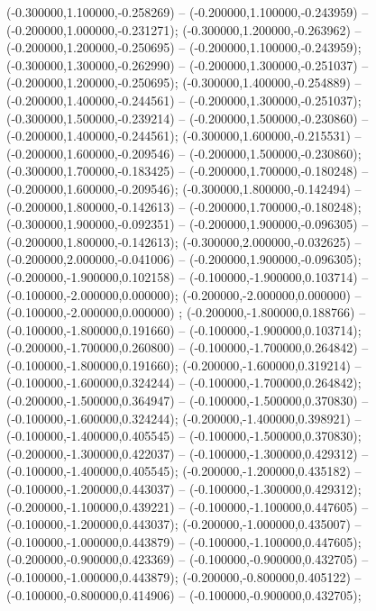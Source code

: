  (-0.300000,1.100000,-0.258269) -- (-0.200000,1.100000,-0.243959) -- (-0.200000,1.000000,-0.231271);
 (-0.300000,1.200000,-0.263962) -- (-0.200000,1.200000,-0.250695) -- (-0.200000,1.100000,-0.243959);
 (-0.300000,1.300000,-0.262990) -- (-0.200000,1.300000,-0.251037) -- (-0.200000,1.200000,-0.250695);
 (-0.300000,1.400000,-0.254889) -- (-0.200000,1.400000,-0.244561) -- (-0.200000,1.300000,-0.251037);
 (-0.300000,1.500000,-0.239214) -- (-0.200000,1.500000,-0.230860) -- (-0.200000,1.400000,-0.244561);
 (-0.300000,1.600000,-0.215531) -- (-0.200000,1.600000,-0.209546) -- (-0.200000,1.500000,-0.230860);
 (-0.300000,1.700000,-0.183425) -- (-0.200000,1.700000,-0.180248) -- (-0.200000,1.600000,-0.209546);
 (-0.300000,1.800000,-0.142494) -- (-0.200000,1.800000,-0.142613) -- (-0.200000,1.700000,-0.180248);
 (-0.300000,1.900000,-0.092351) -- (-0.200000,1.900000,-0.096305) -- (-0.200000,1.800000,-0.142613);
 (-0.300000,2.000000,-0.032625) -- (-0.200000,2.000000,-0.041006) -- (-0.200000,1.900000,-0.096305);
 (-0.200000,-1.900000,0.102158) -- (-0.100000,-1.900000,0.103714) -- (-0.100000,-2.000000,0.000000);
 (-0.200000,-2.000000,0.000000) -- (-0.100000,-2.000000,0.000000) ;
 (-0.200000,-1.800000,0.188766) -- (-0.100000,-1.800000,0.191660) -- (-0.100000,-1.900000,0.103714);
 (-0.200000,-1.700000,0.260800) -- (-0.100000,-1.700000,0.264842) -- (-0.100000,-1.800000,0.191660);
 (-0.200000,-1.600000,0.319214) -- (-0.100000,-1.600000,0.324244) -- (-0.100000,-1.700000,0.264842);
 (-0.200000,-1.500000,0.364947) -- (-0.100000,-1.500000,0.370830) -- (-0.100000,-1.600000,0.324244);
 (-0.200000,-1.400000,0.398921) -- (-0.100000,-1.400000,0.405545) -- (-0.100000,-1.500000,0.370830);
 (-0.200000,-1.300000,0.422037) -- (-0.100000,-1.300000,0.429312) -- (-0.100000,-1.400000,0.405545);
 (-0.200000,-1.200000,0.435182) -- (-0.100000,-1.200000,0.443037) -- (-0.100000,-1.300000,0.429312);
 (-0.200000,-1.100000,0.439221) -- (-0.100000,-1.100000,0.447605) -- (-0.100000,-1.200000,0.443037);
 (-0.200000,-1.000000,0.435007) -- (-0.100000,-1.000000,0.443879) -- (-0.100000,-1.100000,0.447605);
 (-0.200000,-0.900000,0.423369) -- (-0.100000,-0.900000,0.432705) -- (-0.100000,-1.000000,0.443879);
 (-0.200000,-0.800000,0.405122) -- (-0.100000,-0.800000,0.414906) -- (-0.100000,-0.900000,0.432705);
